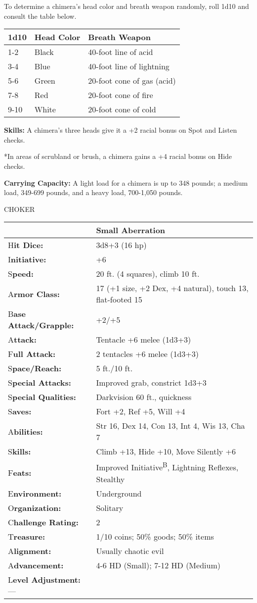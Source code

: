 \documentclass{article}
\begin{document}
To determine a chimera's head color and breath weapon randomly, roll 1d10 and consult 
the table below.

\begin{tabular}{|>{\raggedright}p{19pt}|>{\raggedright}p{48pt}|>{\raggedright}p{102pt}|}
\hline
1\textbf{d10} & H\textbf{ead Color} & B\textbf{reath Weapon}\tabularnewline
\hline
1-2 & Black & 40-foot line of acid\tabularnewline
\hline
3-4 & Blue & 40-foot line of lightning\tabularnewline
\hline
5-6 & Green & 20-foot cone of gas (acid)\tabularnewline
\hline
7-8 & Red & 20-foot cone of fire\tabularnewline
\hline
9-10 & White & 20-foot cone of cold\tabularnewline
\hline
\end{tabular}

\textbf{Skills:} A chimera's three heads give it a +2 racial bonus on Spot and 
Listen checks.

*In areas of scrubland or brush, a chimera gains a +4 racial bonus on Hide checks.

\textbf{Carrying Capacity:} A light load for a chimera is up to 348 pounds; a medium 
load, 349-699 pounds, and a heavy load, 700-1,050 pounds.

\vspace{12pt}
{\LARGE{}CHOKER}

\begin{tabular}{|>{\raggedright}p{91pt}|>{\raggedright}p{226pt}|}
\hline
  & Small Aberration\tabularnewline
\hline
H\textbf{it Dice:} & 3d8+3 (16 hp)\tabularnewline
\hline
I\textbf{nitiative:} & +6\tabularnewline
\hline
S\textbf{peed:} & 20 ft. (4 squares), climb 10 ft.\tabularnewline
\hline
A\textbf{rmor Class:} & 17 (+1 size, +2 Dex, +4 natural), touch 13, flat-footed 
15\tabularnewline
\hline
B\textbf{ase Attack/Grapple:} & +2/+5\tabularnewline
\hline
A\textbf{ttack:} & Tentacle +6 melee (1d3+3)\tabularnewline
\hline
F\textbf{ull Attack:} & 2 tentacles +6 melee (1d3+3)\tabularnewline
\hline
S\textbf{pace/Reach:} & 5 ft./10 ft.\tabularnewline
\hline
S\textbf{pecial Attacks:} & Improved grab, constrict 1d3+3\tabularnewline
\hline
S\textbf{pecial Qualities:} & Darkvision 60 ft., quickness\tabularnewline
\hline
S\textbf{aves:} & Fort +2, Ref +5, Will +4\tabularnewline
\hline
A\textbf{bilities:} & Str 16, Dex 14, Con 13, Int 4, Wis 13, Cha 7\tabularnewline
\hline
S\textbf{kills:} & Climb +13, Hide +10, Move Silently +6\tabularnewline
\hline
F\textbf{eats:} & Improved Initiative\textsuperscript{B}, Lightning Reflexes, Stealthy\tabularnewline
\hline
E\textbf{nvironment:} & Underground\tabularnewline
\hline
O\textbf{rganization:} & Solitary\tabularnewline
\hline
C\textbf{hallenge Rating:} & 2\tabularnewline
\hline
T\textbf{reasure:} & 1/10 coins; 50\% goods; 50\% items\tabularnewline
\hline
A\textbf{lignment:} & Usually chaotic evil\tabularnewline
\hline
A\textbf{dvancement:} & 4-6 HD (Small); 7-12 HD (Medium)\tabularnewline
\hline
L\textbf{evel Adjustment:}--- & \tabularnewline
\hline
\end{tabular}
\end{document}
